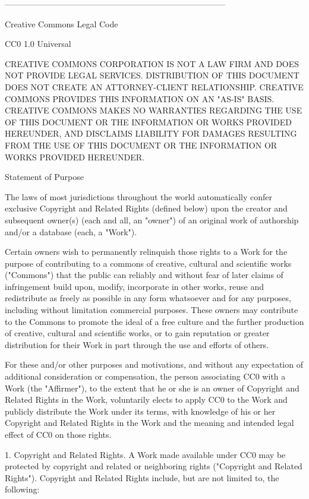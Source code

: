 \documentclass[parskip=half]{scrartcl}
\begin{document}
--------------------------------------------------------------------------------

Creative Commons Legal Code

CC0 1.0 Universal

    CREATIVE COMMONS CORPORATION IS NOT A LAW FIRM AND DOES NOT PROVIDE
    LEGAL SERVICES. DISTRIBUTION OF THIS DOCUMENT DOES NOT CREATE AN
    ATTORNEY-CLIENT RELATIONSHIP. CREATIVE COMMONS PROVIDES THIS
    INFORMATION ON AN "AS-IS" BASIS. CREATIVE COMMONS MAKES NO WARRANTIES
    REGARDING THE USE OF THIS DOCUMENT OR THE INFORMATION OR WORKS
    PROVIDED HEREUNDER, AND DISCLAIMS LIABILITY FOR DAMAGES RESULTING FROM
    THE USE OF THIS DOCUMENT OR THE INFORMATION OR WORKS PROVIDED
    HEREUNDER.

Statement of Purpose

The laws of most jurisdictions throughout the world automatically confer
exclusive Copyright and Related Rights (defined below) upon the creator
and subsequent owner(s) (each and all, an "owner") of an original work of
authorship and/or a database (each, a "Work").

Certain owners wish to permanently relinquish those rights to a Work for
the purpose of contributing to a commons of creative, cultural and
scientific works ("Commons") that the public can reliably and without fear
of later claims of infringement build upon, modify, incorporate in other
works, reuse and redistribute as freely as possible in any form whatsoever
and for any purposes, including without limitation commercial purposes.
These owners may contribute to the Commons to promote the ideal of a free
culture and the further production of creative, cultural and scientific
works, or to gain reputation or greater distribution for their Work in
part through the use and efforts of others.

For these and/or other purposes and motivations, and without any
expectation of additional consideration or compensation, the person
associating CC0 with a Work (the "Affirmer"), to the extent that he or she
is an owner of Copyright and Related Rights in the Work, voluntarily
elects to apply CC0 to the Work and publicly distribute the Work under its
terms, with knowledge of his or her Copyright and Related Rights in the
Work and the meaning and intended legal effect of CC0 on those rights.

1. Copyright and Related Rights. A Work made available under CC0 may be
protected by copyright and related or neighboring rights ("Copyright and
Related Rights"). Copyright and Related Rights include, but are not
limited to, the following:
\end{document}
